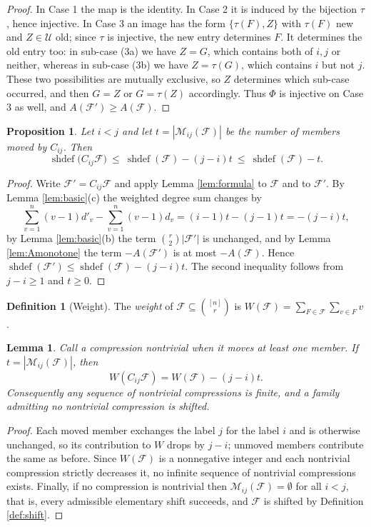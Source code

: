 \documentclass[11pt,reqno]{amsart}
\theoremstyle{plain}
\newtheorem{proposition}[theorem]{Proposition}
\newtheorem{lemma}[theorem]{Lemma}
\theoremstyle{definition}
\newtheorem{definition}[theorem]{Definition}
\DeclareMathOperator{\shdef}{shdef}
\newcommand{\F}{\mathcal{F}}
\newcommand{\Uu}{\mathcal{U}}
\newcommand{\M}{\mathcal{M}}
\begin{document}
\begin{proof}
In Case 1 the map is the identity. In Case 2 it is induced by the bijection $\tau$, hence injective.
In Case 3 an image has the form $\{\tau(F),Z\}$ with $\tau(F)$ new and $Z\in\Uu$ old; since $\tau$ is
injective, the new entry determines $F$. It determines the old entry too: in sub-case (3a) we have
$Z=G$, which contains both of $i,j$ or neither, whereas in sub-case (3b) we have $Z=\tau(G)$, which
contains $i$ but not $j$. These two possibilities are mutually exclusive, so $Z$ determines which
sub-case occurred, and then $G=Z$ or $G=\tau(Z)$ accordingly. Thus $\Phi$ is injective on Case 3 as
well, and $A(\F')\ge A(\F)$.
\end{proof}

\begin{proposition}\label{prop:drop}
Let $i<j$ and let $t=|\M_{ij}(\F)|$ be the number of members moved by $C_{ij}$. Then
\[
\shdef\bigl(C_{ij}\F\bigr)\ \le\ \shdef(\F)-(j-i)t\ \le\ \shdef(\F)-t .
\]
\end{proposition}

\begin{proof}
Write $\F'=C_{ij}\F$ and apply Lemma \ref{lem:formula} to $\F$ and to $\F'$. By Lemma
\ref{lem:basic}(c) the weighted degree sum changes by
\[
\sum_{v=1}^{n}(v-1)d'_v-\sum_{v=1}^{n}(v-1)d_v=(i-1)t-(j-1)t=-(j-i)t,
\]
by Lemma \ref{lem:basic}(b) the term $\binom{r}{2}|\F'|$ is unchanged, and by Lemma
\ref{lem:Amonotone} the term $-A(\F')$ is at most $-A(\F)$. Hence
$\shdef(\F')\le\shdef(\F)-(j-i)t$. The second inequality follows from $j-i\ge1$ and $t\ge0$.
\end{proof}

\begin{definition}[Weight]\label{def:weight}
The \emph{weight} of $\F\subseteq\binom{[n]}{r}$ is
$W(\F)=\sum_{F\in\F}\sum_{v\in F}v$.
\end{definition}

\begin{lemma}\label{lem:termination}
Call a compression \emph{nontrivial} when it moves at least one member. If
$t=|\M_{ij}(\F)|$, then
\[
W(C_{ij}\F)=W(\F)-(j-i)t.
\]
Consequently any sequence of nontrivial compressions is finite, and a family admitting no
nontrivial compression is shifted.
\end{lemma}

\begin{proof}
Each moved member exchanges the label $j$ for the label $i$ and is otherwise unchanged, so its
contribution to $W$ drops by $j-i$; unmoved members contribute the same as before. Since $W(\F)$ is
a nonnegative integer and each nontrivial compression strictly decreases it, no infinite sequence
of nontrivial compressions exists. Finally, if no compression is nontrivial
then $\M_{ij}(\F)=\emptyset$ for all $i<j$, that is, every admissible elementary shift succeeds, and
$\F$ is shifted by Definition \ref{def:shift}.
\end{proof}
\end{document}
